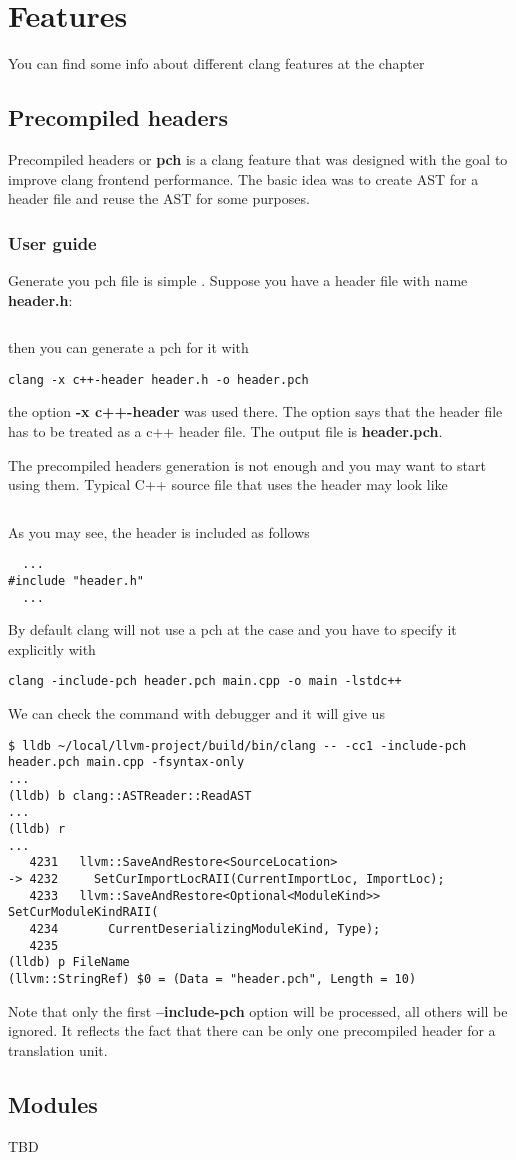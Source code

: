 \chapter{Features}

You can find some info about different clang features at the chapter

\section{Precompiled headers}
Precompiled headers or \textbf{pch} is a clang feature that was
designed with the goal to improve clang frontend performance. The
basic idea was to create AST for a header file and reuse the AST for
some purposes.

\subsection{User guide}
Generate you pch file is simple \cite{clang:user_manual}. Suppose you have a header file with
name \textbf{header.h}:
\inputminted{c++}{./src/pch/simple/header.h} then you can generate a pch for it with
\begin{verbatim}
clang -x c++-header header.h -o header.pch
\end{verbatim}
the option \textbf{-x c++-header} was used there. The option says that
the header file has to be treated as a c++ header file. The output
file is \textbf{header.pch}.

The precompiled headers generation is not enough and you may want to
start using them. Typical C++ source file that uses the header may
look like
\inputminted{c++}{./src/pch/simple/main.cpp}
As you may see, the header is included as follows
\begin{verbatim}
  ...
#include "header.h"
  ...
\end{verbatim}
By default clang will not use a pch at the case and you have to
specify it explicitly with
\begin{verbatim}
clang -include-pch header.pch main.cpp -o main -lstdc++
\end{verbatim}
We can check the command with debugger and it will give us
\begin{verbatim}
$ lldb ~/local/llvm-project/build/bin/clang -- -cc1 -include-pch header.pch main.cpp -fsyntax-only
...
(lldb) b clang::ASTReader::ReadAST                                             
...
(lldb) r
...
   4231   llvm::SaveAndRestore<SourceLocation>
-> 4232     SetCurImportLocRAII(CurrentImportLoc, ImportLoc);
   4233   llvm::SaveAndRestore<Optional<ModuleKind>> SetCurModuleKindRAII(
   4234       CurrentDeserializingModuleKind, Type);
   4235 
(lldb) p FileName
(llvm::StringRef) $0 = (Data = "header.pch", Length = 10)
\end{verbatim}
Note that only the first \textbf{--include-pch} option will be
processed, all others will be ignored. It reflects the fact that there
can be only one precompiled header for a translation unit.

\section{Modules}
TBD

